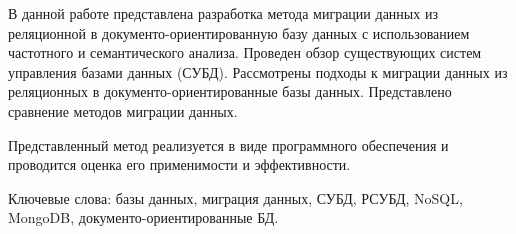 \begin{essay}{}

В данной работе представлена разработка метода миграции данных 
из реляционной в документо-ориентированную базу данных 
с использованием частотного и семантического анализа.
Проведен обзор существующих систем управления базами данных (СУБД).
Рассмотрены подходы к миграции данных из реляционных в документо-ориентированные базы данных.
Представлено сравнение методов миграции данных.

Представленный метод реализуется в виде программного обеспечения и
проводится оценка его применимости и эффективности.

Ключевые слова: базы данных, миграция данных, СУБД, РСУБД, NoSQL, MongoDB, документо-ориентированные БД.

\end{essay}